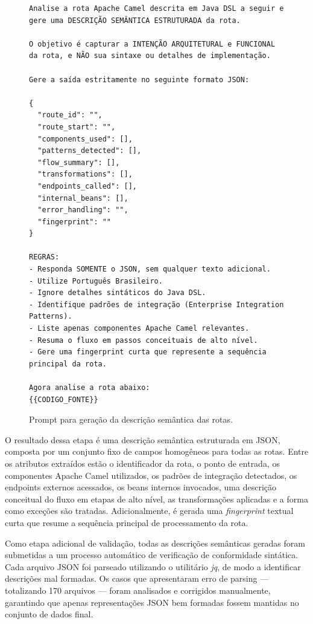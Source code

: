 \documentclass[12pt,a4paper]{article}
\begin{document}
\vspace{0.6\baselineskip}

\begin{figure}[H]
\centering
\begin{minipage}{0.97\textwidth}
\lstset{style=promptbox}
\begin{lstlisting}
Analise a rota Apache Camel descrita em Java DSL a seguir e gere uma DESCRIÇÃO SEMÂNTICA ESTRUTURADA da rota.

O objetivo é capturar a INTENÇÃO ARQUITETURAL e FUNCIONAL da rota, e NÃO sua sintaxe ou detalhes de implementação.

Gere a saída estritamente no seguinte formato JSON:

{
  "route_id": "",
  "route_start": "",
  "components_used": [],
  "patterns_detected": [],
  "flow_summary": [],
  "transformations": [],
  "endpoints_called": [],
  "internal_beans": [],
  "error_handling": "",
  "fingerprint": ""
}

REGRAS:
- Responda SOMENTE o JSON, sem qualquer texto adicional.
- Utilize Português Brasileiro.
- Ignore detalhes sintáticos do Java DSL.
- Identifique padrões de integração (Enterprise Integration Patterns).
- Liste apenas componentes Apache Camel relevantes.
- Resuma o fluxo em passos conceituais de alto nível.
- Gere uma fingerprint curta que represente a sequência principal da rota.

Agora analise a rota abaixo:
{{CODIGO_FONTE}}
\end{lstlisting}
\end{minipage}
\caption{Prompt para geração da descrição semântica das rotas.}
\label{fig:prompt-descricao-semantica}
\end{figure}

O resultado dessa etapa é uma descrição semântica estruturada em JSON, composta por um conjunto fixo de campos homogêneos para todas as rotas. Entre os atributos extraídos estão o identificador da rota, o ponto de entrada, os componentes Apache Camel utilizados, os padrões de integração detectados, os endpoints externos acessados, os beans internos invocados, uma descrição conceitual do fluxo em etapas de alto nível, as transformações aplicadas e a forma como exceções são tratadas. Adicionalmente, é gerada uma \emph{fingerprint} textual curta que resume a sequência principal de processamento da rota.

Como etapa adicional de validação, todas as descrições semânticas geradas foram submetidas a um processo automático de verificação de conformidade sintática. Cada arquivo JSON foi parseado utilizando o utilitário \textit{jq}, de modo a identificar descrições mal formadas. Os casos que apresentaram erro de parsing — totalizando 170 arquivos — foram analisados e corrigidos manualmente, garantindo que apenas representações JSON bem formadas fossem mantidas no conjunto de dados final.
\end{document}
